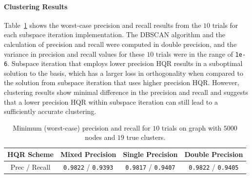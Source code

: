 \documentclass[review,onefignum,onetabnum]{siamart190516}
\begin{document}
\paragraph{Clustering Results} 
Table~\ref{table:PR} shows the worst-case precision and recall results from the $10$ trials for each subspace iteration implementation. 
The DBSCAN algorithm and the calculation of precision and recall were computed in double precision, and the variance in precision and recall values for these $10$ trials were in the range of {\tt 1e-6}.
Subspace iteration that employs lower precision HQR results in a suboptimal solution to the basis, which has a larger loss in orthogonality when compared to the solution from subspace iteration that uses higher precision HQR. 
However, clustering results show minimal difference in the precision and recall and suggests that a lower precision HQR within subspace iteration can still lead to a sufficiently accurate clustering. 
\begin{table}[h!]
	\centering
\begin{tabular}{ |c|c|c|c| }
\hline
HQR Scheme & Mixed Precision & Single Precision & Double Precision \\ \hline
Prec / Recall & 
{\tt 0.9822} / {\tt 0.9393} &
{\tt 0.9817} / {\tt 0.9407} &
{\tt 0.9822} / {\tt 0.9405} \\
\hline
\end{tabular}
	\caption{\label{table:PR} Minimum (worst-case) precision and recall for $10$ trials on graph with $5000$ nodes and $19$ true clusters.}
\end{table}
\end{document}
